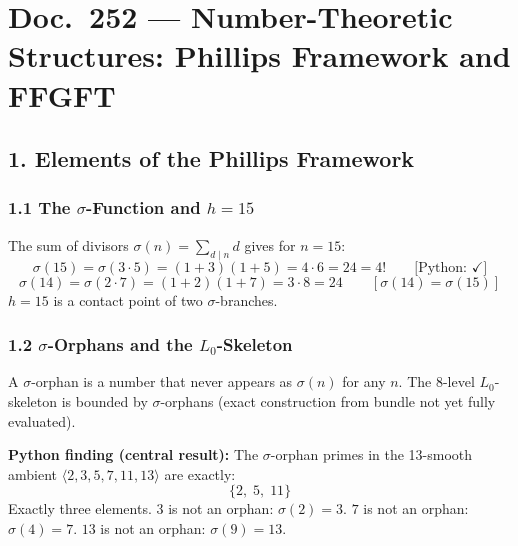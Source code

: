 \section*{Doc.\ 252 — Number-Theoretic Structures: Phillips Framework and FFGFT}

\begin{abstract}
Paul Phillips submitted a number-theoretic framework to the IPI group connecting
structural properties of the $\sigma$-function (sum of divisors), homology, and
dimensional dynamics (23 files, SHA-256 pinned). This document is a systematic
comparison with FFGFT. All central claims were Python-verified. The bundle has
not yet been fully evaluated; open points are named explicitly.
Central finding: the $\sigma$-orphan primes in the 13-smooth ambient
$\langle 2,3,5,7,11,13 \rangle$ are exactly $\{2, 5, 11\}$ — and $5$, $11$
are exactly the middle terms of the cubic sequence $3 \to 5 \to 11 \to 1321$.
\end{abstract}

\subsection*{1. Elements of the Phillips Framework}

\subsubsection*{1.1 The $\sigma$-Function and $h = 15$}

The sum of divisors $\sigma(n) = \sum_{d \mid n} d$ gives for $n = 15$:
\[
\sigma(15) = \sigma(3 \cdot 5) = (1+3)(1+5) = 4 \cdot 6 = 24 = 4!
\qquad \text{[Python: } \checkmark\text{]}
\]
\[
\sigma(14) = \sigma(2 \cdot 7) = (1+2)(1+7) = 3 \cdot 8 = 24
\qquad [\sigma(14) = \sigma(15)]
\]
$h = 15$ is a contact point of two $\sigma$-branches.

\subsubsection*{1.2 $\sigma$-Orphans and the $L_0$-Skeleton}

A $\sigma$-orphan is a number that never appears as $\sigma(n)$ for any $n$.
The 8-level $L_0$-skeleton is bounded by $\sigma$-orphans
(exact construction from bundle not yet fully evaluated).

\begin{mdframed}[style=ok]
\textbf{Python finding (central result):} The $\sigma$-orphan primes in the
13-smooth ambient $\langle 2,3,5,7,11,13 \rangle$ are exactly:
\[
\boxed{\{2,\; 5,\; 11\}}
\]
Exactly three elements. $3$ is not an orphan: $\sigma(2) = 3$.
$7$ is not an orphan: $\sigma(4) = 7$. $13$ is not an orphan: $\sigma(9) = 13$.
\end{mdframed}

